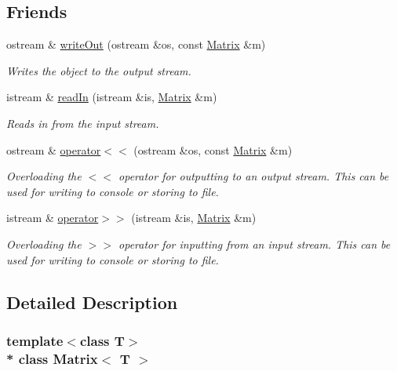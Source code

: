 \subsection*{Friends}
\begin{DoxyCompactItemize}
\item 
ostream \& \hyperlink{class_matrix_ab3d577ddd4221a3da49296c2c4ae4e04}{write\+Out} (ostream \&os, const \hyperlink{class_matrix}{Matrix} \&m)
\begin{DoxyCompactList}\small\item\em Writes the object to the output stream. \end{DoxyCompactList}\item 
istream \& \hyperlink{class_matrix_a7518cae16b9081c23c94b77b6d84e0d8}{read\+In} (istream \&is, \hyperlink{class_matrix}{Matrix} \&m)
\begin{DoxyCompactList}\small\item\em Reads in from the input stream. \end{DoxyCompactList}\item 
ostream \& \hyperlink{class_matrix_a5ed9a90fd6f010e7e9840a17d92d5361}{operator$<$$<$} (ostream \&os, const \hyperlink{class_matrix}{Matrix} \&m)
\begin{DoxyCompactList}\small\item\em Overloading the $<$$<$ operator for outputting to an output stream. This can be used for writing to console or storing to file. \end{DoxyCompactList}\item 
istream \& \hyperlink{class_matrix_afcea9fa7d9a5052070fe1fda963ef237}{operator$>$$>$} (istream \&is, \hyperlink{class_matrix}{Matrix} \&m)
\begin{DoxyCompactList}\small\item\em Overloading the $>$$>$ operator for inputting from an input stream. This can be used for writing to console or storing to file. \end{DoxyCompactList}\end{DoxyCompactItemize}


\subsection{Detailed Description}
\subsubsection*{template$<$class T$>$\\*
class Matrix$<$ T $>$}

